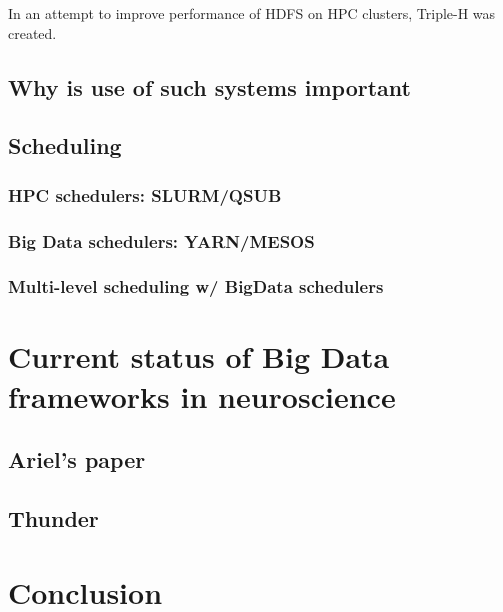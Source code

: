 \documentclass{report}
\begin{document}

	
	
	
    In an attempt to improve performance of HDFS on HPC clusters, Triple-H was
created.  \section{Why is use of such systems important} \section{Scheduling}
\subsection{HPC schedulers: SLURM/QSUB} \subsection{Big Data schedulers:
YARN/MESOS} \subsection{Multi-level scheduling w/ BigData schedulers}
\chapter{Current status of Big Data frameworks in neuroscience} \section{Ariel's
paper} \section{Thunder} \chapter{Conclusion}
\end{document}
